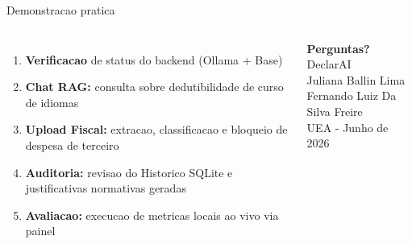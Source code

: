 \documentclass[aspectratio=169,12pt]{beamer}
\begin{document}
\begin{frame}{Demonstracao pratica}
\begin{columns}[T]
  \begin{enumerate}\small
    \item \textbf{Verificacao} de status do backend (Ollama + Base)
    \item \textbf{Chat RAG:} consulta sobre dedutibilidade de curso de idiomas
    \item \textbf{Upload Fiscal:} extracao, classificacao e bloqueio de despesa de terceiro
    \item \textbf{Auditoria:} revisao do Historico SQLite e justificativas normativas geradas
    \item \textbf{Avaliacao:} execucao de metricas locais ao vivo via painel
  \end{enumerate}
  \begin{center}
    \vspace{0.5cm}
    {\Huge\bfseries\color{declaraGold} Perguntas?}\\[0.8cm]
    {\Large\color{declaraDark} DeclarAI}\\[0.3cm]
    \small\color{declaraGray}
    Juliana Ballin Lima\\
    Fernando Luiz Da Silva Freire\\[0.3cm]
    UEA - Junho de 2026
  \end{center}
\end{columns}
\end{frame}
\end{document}
